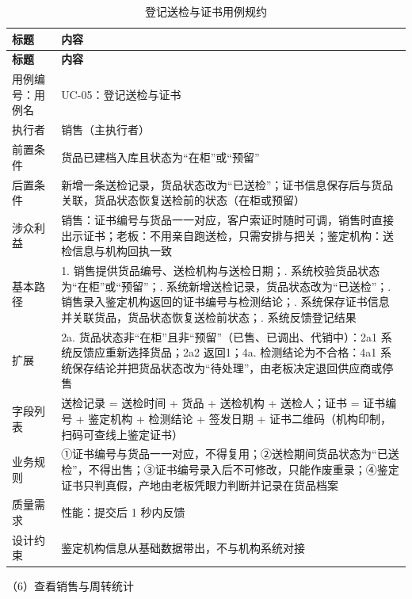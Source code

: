 \documentclass[12pt, a4paper]{ctexart}
\begin{document}
{\small
\begin{longtable}{@{}p{2.4cm} p{12.9cm}@{}}
\caption{登记送检与证书用例规约}\label{tab:uc-05}\\
\toprule
\textbf{标题} & \textbf{内容} \\
\midrule
\endfirsthead
\toprule
\textbf{标题} & \textbf{内容} \\
\midrule
\endhead
用例编号：用例名 & UC-05：登记送检与证书 \\
\midrule
执行者 & 销售（主执行者） \\
\midrule
前置条件 & 货品已建档入库且状态为“在柜”或“预留” \\
\midrule
后置条件 & 新增一条送检记录，货品状态改为“已送检”；证书信息保存后与货品关联，货品状态恢复送检前的状态（在柜或预留） \\
\midrule
涉众利益 & 销售：证书编号与货品一一对应，客户索证时随时可调，销售时直接出示证书；\newline 老板：不用亲自跑送检，只需安排与把关；\newline 鉴定机构：送检信息与机构回执一致 \\
\midrule
基本路径 & 1. 销售提供货品编号、送检机构与送检日期；\newline 2. 系统校验货品状态为“在柜”或“预留”；\newline 3. 系统新增送检记录，货品状态改为“已送检”；\newline 4. 销售录入鉴定机构返回的证书编号与检测结论；\newline 5. 系统保存证书信息并关联货品，货品状态恢复送检前状态；\newline 6. 系统反馈登记结果 \\
\midrule
扩展 & 2a. 货品状态非“在柜”且非“预留”（已售、已调出、代销中）：2a1 系统反馈应重新选择货品；2a2 返回1；\newline 4a. 检测结论为不合格：4a1 系统保存结论并把货品状态改为“待处理”，由老板决定退回供应商或停售 \\
\midrule
字段列表 & 送检记录 = 送检时间 + 货品 + 送检机构 + 送检人；\newline 证书 = 证书编号 + 鉴定机构 + 检测结论 + 签发日期 + 证书二维码（机构印制，扫码可查线上鉴定证书） \\
\midrule
业务规则 & ①证书编号与货品一一对应，不得复用；\newline ②送检期间货品状态为“已送检”，不得出售；\newline ③证书编号录入后不可修改，只能作废重录；\newline ④鉴定证书只判真假，产地由老板凭眼力判断并记录在货品档案 \\
\midrule
质量需求 & 性能：提交后 1 秒内反馈 \\
\midrule
设计约束 & 鉴定机构信息从基础数据带出，不与机构系统对接 \\
\midrule
\bottomrule
\end{longtable}}
\noindent（6）查看销售与周转统计
\end{document}

